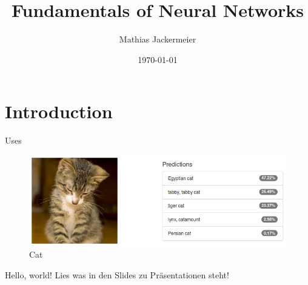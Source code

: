 \documentclass{beamer}
\title{Fundamentals of Neural Networks}
\date{\today}
\author{Mathias Jackermeier}
\institute{Technische Universität München}
\begin{document}
	\maketitle
	\section{Introduction}
	\begin{frame}{Uses}
		\begin{figure}
			\includegraphics[scale=.45]{img/alexnet}
			\caption{Cat}
		\end{figure}
		Hello, world!
		Lies was in den Slides zu Präsentationen steht!
	\end{frame}
\end{document}
